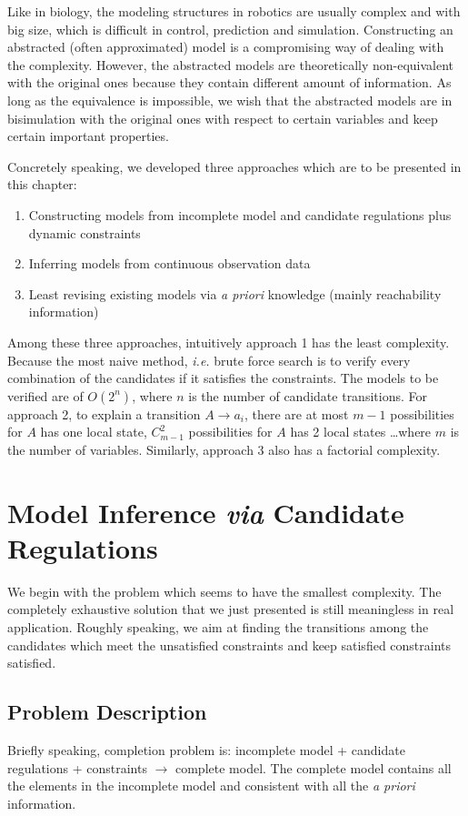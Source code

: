 Like in biology, the modeling structures in robotics are usually complex and with big size, which is difficult in control, prediction and simulation.
Constructing an abstracted (often approximated) model is a compromising way of dealing with the complexity.
However, the abstracted models are theoretically non-equivalent with the original ones because they contain different amount of information.
As long as the equivalence is impossible, we wish that the abstracted models are in bisimulation with the original ones with respect to certain variables and keep certain important properties.

Concretely speaking, we developed three approaches which are to be presented in this chapter:

\begin{enumerate}
    \item Constructing models from incomplete model and candidate regulations plus dynamic constraints
    \item Inferring models from continuous observation data
    \item Least revising existing models via \textit{a priori} knowledge (mainly reachability information)
\end{enumerate}

Among these three approaches, intuitively approach 1 has the least complexity. 
Because the most naive method, \textit{i.e.} brute force search is to verify every combination of the candidates if it satisfies the constraints. 
The models to be verified are of $O(2^n)$, where $n$ is the number of candidate transitions.
For approach 2, to explain a transition $A\to a_i$, there are at most $m-1$ possibilities for $A$ has one local state, $C_{m-1}^2$ possibilities for $A$ has 2 local states \ldots where $m$ is the number of variables.
Similarly, approach 3 also has a factorial complexity.

\section{Model Inference \textit{via} Candidate Regulations}
We begin with the problem which seems to have the smallest complexity.
The completely exhaustive solution that we just presented is still meaningless in real application.
Roughly speaking, we aim at finding the transitions among the candidates which meet the unsatisfied constraints and keep satisfied constraints satisfied.

\subsection{Problem Description}
Briefly speaking, completion problem is: incomplete model + candidate regulations + constraints $\to$ complete model.
The complete model contains all the elements in the incomplete model and consistent with all the \textit{a priori} information. 


